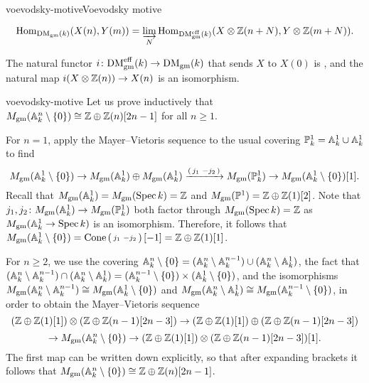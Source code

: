 \begin{topic}{voevodsky-motive}{Voevodsky motive}
\begin{enumerate}[label=(\roman*)]
        \[ \Hom_{\textup{DM}_\textup{gm}(k)}(X(n), Y(m)) = \varinjlim_{N} \Hom_{\textup{DM}_\textup{gm}^\textup{eff}(k)}(X \otimes \ZZ(n + N), Y \otimes \ZZ(m + N)) . \]
    \end{enumerate}
    The natural functor $i \colon \textup{DM}_\textup{gm}^\textup{eff}(k) \to \textup{DM}_\textup{gm}(k)$ that sends $X$ to $X(0)$ is  , and the natural map $i(X \otimes \ZZ(n)) \to X(n)$ is an isomorphism.
\end{topic}

\begin{example}{voevodsky-motive}
    Let us prove inductively that $M_\textup{gm}(\AA^n_k \setminus \{ 0 \}) \cong \ZZ \oplus \ZZ(n)[2n - 1]$ for all $n \ge 1$.
    
    For $n = 1$, apply the Mayer--Vietoris sequence to the usual covering $\PP^1_k = \AA^1_k \cup \AA^1_k$ to find
    \[ M_\textup{gm}(\AA^1_k \setminus \{ 0 \}) \to M_\textup{gm}(\AA^1_k) \oplus M_\textup{gm}(\AA^1_k) \xrightarrow{\left(\begin{smallmatrix} j_1 & -j_2 \end{smallmatrix}\right)} M_\textup{gm}(\PP^1_k) \to M_\textup{gm}(\AA^1_k \setminus \{ 0 \})[1] . \]
    Recall that $M_\textup{gm}(\AA^1_k) = M_\textup{gm}(\Spec k) = \ZZ$ and $M_\textup{gm}(\PP^1) = \ZZ \oplus \ZZ(1)[2]$. Note that $j_1, j_2 \colon M_\textup{gm}(\AA^1_k) \to M_\textup{gm}(\PP^1_k)$ both factor through $M_\textup{gm}(\Spec k) = \ZZ$ as $M_\textup{gm}(\AA^1_k \to \Spec k)$ is an isomorphism. Therefore, it follows that $M_\textup{gm}(\AA^1_k \setminus \{ 0 \}) = \operatorname{Cone}\left(\begin{smallmatrix} j_1 & -j_2 \end{smallmatrix}\right)[-1] = \ZZ \oplus \ZZ(1)[1]$.
    
    For $n \ge 2$, we use the covering $\AA^n_k \setminus \{ 0 \} = (\AA^n_k \setminus \AA^{n - 1}_k) \cup (\AA^n_k \setminus \AA^1_k)$, the fact that $(\AA^n_k \setminus \AA^{n - 1}_k) \cap (\AA^n_k \setminus \AA^1_k) = (\AA^{n - 1}_k \setminus \{ 0 \}) \times (\AA^1_k \setminus \{ 0 \})$, and the isomorphisms $M_\textup{gm}(\AA^n_k \setminus \AA^{n - 1}_k) \cong M_\textup{gm}(\AA^1_k \setminus \{ 0 \})$ and $M_\textup{gm}(\AA^n_k \setminus \AA^1_k) \cong M_\textup{gm}(\AA^{n - 1}_k \setminus \{ 0 \})$, in order to obtain the Mayer--Vietoris sequence
    \[ (\ZZ \oplus \ZZ(1)[1]) \otimes (\ZZ \oplus \ZZ(n - 1)[2n - 3]) \to (\ZZ \oplus \ZZ(1)[1]) \oplus (\ZZ \oplus \ZZ(n - 1)[2n - 3]) \]
    \[ \to M_\textup{gm}(\AA^n_k \setminus \{ 0 \}) \to (\ZZ \oplus \ZZ(1)[1]) \otimes (\ZZ \oplus \ZZ(n - 1)[2n - 3])[1] . \]
    The first map can be written down explicitly, so that after expanding brackets it follows that $M_\textup{gm}(\AA^n_k \setminus \{ 0 \}) \cong \ZZ \oplus \ZZ(n)[2n - 1]$.
\end{example}

